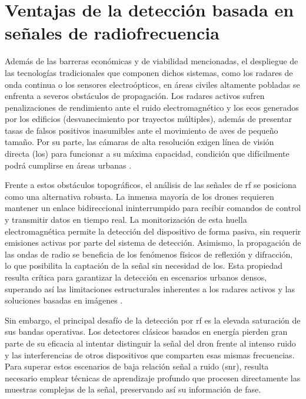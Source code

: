 \section{Ventajas de la detección basada en señales de radiofrecuencia}
\label{sec:ventaja_tactica_rf}
Además de las barreras económicas y de viabilidad mencionadas, el despliegue de las tecnologías tradicionales que componen dichos sistemas, como los radares de onda continua o los sensores electroópticos, en áreas civiles altamente pobladas se enfrenta a severos obstáculos de propagación. Los radares activos sufren penalizaciones de rendimiento ante el ruido electromagnético y los ecos generados por los edificios (desvanecimiento por trayectos múltiples), además de presentar tasas de falsos positivos inasumibles ante el movimiento de aves de pequeño tamaño. Por su parte, las cámaras de alta resolución exigen línea de visión directa (\gls{los}) para funcionar a su máxima capacidad, condición que difícilmente podrá cumplirse en áreas urbanas \cite{ezuma_detection_2020}.

Frente a estos obstáculos topográficos, el análisis de las señales de \gls{rf} se posiciona como una alternativa robusta. La inmensa mayoría de los drones requieren mantener un enlace bidireccional ininterrumpido para recibir comandos de control y transmitir datos en tiempo real. La monitorización de esta huella electromagnética permite la detección del dispositivo de forma pasiva, sin requerir emisiones activas por parte del sistema de detección. Asimismo, la propagación de las ondas de radio se beneficia de los fenómenos físicos de reflexión y difracción, lo que posibilita la captación de la señal sin necesidad de \gls{los}. Esta propiedad resulta crítica para garantizar la detección en escenarios urbanos densos, superando así las limitaciones estructurales inherentes a los radares activos y las soluciones basadas en imágenes \cite{ezuma_detection_2020}.

Sin embargo, el principal desafío de la detección por \gls{rf} es la elevada saturación de sus bandas operativas. Los detectores clásicos basados en energía pierden gran parte de su eficacia al intentar distinguir la señal del dron frente al intenso ruido y las interferencias de otros dispositivos que comparten esas mismas frecuencias. Para superar estos escenarios de baja relación señal a ruido (\gls{snr}), resulta necesario emplear técnicas de aprendizaje profundo que procesen directamente las muestras complejas de la señal, preservando así su información de fase.

